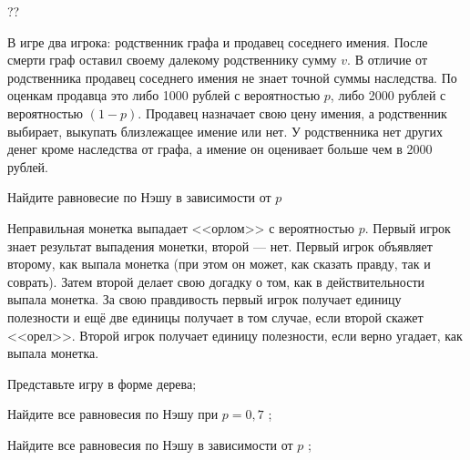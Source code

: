 \begin{problem}[Наследство]\par
\begin{source} \cite{slanthcev:gt}?? \end{source}
В игре два игрока: родственник графа и продавец соседнего имения. После смерти граф оставил своему далекому родственнику сумму  $v$. В отличие от родственника продавец соседнего имения не знает точной суммы наследства. По оценкам продавца это либо 1000 рублей с вероятностью  $p$, либо 2000 рублей с вероятностью  $\left(1-p\right)$. Продавец назначает свою цену имения, а родственник выбирает, выкупать близлежащее имение или нет. У родственника нет других денег кроме наследства от графа, а имение он оценивает больше чем в 2000 рублей.\par
Найдите равновесие по Нэшу в зависимости от  $p$\par



\begin{sol}

\end{sol}
\end{problem}






\begin{problem}
 Неправильная монетка выпадает <<орлом>> с вероятностью  $p$. Первый игрок знает результат выпадения монетки, второй --- нет. Первый игрок объявляет второму, как выпала монетка (при этом он может, как сказать правду, так и соврать). Затем второй делает свою догадку о том, как в действительности выпала монетка. За свою правдивость первый игрок получает единицу полезности и ещё две единицы получает в том случае, если второй скажет <<орел>>. Второй игрок получает единицу полезности, если верно угадает, как выпала монетка.\par
Представьте игру в форме дерева;\par
Найдите все равновесия по Нэшу при  $p=0,7$ ;\par
Найдите все равновесия по Нэшу в зависимости от  $p$ ;



\begin{sol}

\end{sol}
\end{problem}





